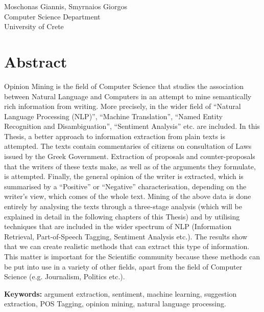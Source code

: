 Moschonas Giannis, Smyrnaios Giorgos\\
Computer Science Department\\
University of Crete \setlength{\parskip}{0.5cm}

\thispagestyle{plain}			%
\setlength{\parskip}{0pt plus 1.0pt}
\section*{Abstract}
Opinion Mining is the field of Computer Science that studies the association between Natural Language and Computers in an attempt to mine semantically rich information from writing. More precisely, in the wider field of ``Natural Language Processing (NLP)'', ``Machine Translation'', ``Named Entity Recognition and Disambiguation'', ``Sentiment Analysis'' etc. are included. In this Thesis, a better approach to information extraction from plain texts is attempted. The texts contain commentaries of citizens on consultation of Laws issued by the Greek Government. Extraction of proposals and counter-proposals that the writers of these texts make, as well as of the arguments they formulate, is attempted. Finally, the general opinion of the writer is extracted, which is summarised by a ``Positive'' or ``Negative'' characterisation, depending on  the writer's view, which comes of the whole text. Mining of the above data is done entirely by analysing the texts through a three-stage analysis (which will be explained in detail in the following chapters of this Thesis) and by utilising techniques that are included in the wider spectrum of NLP (Information Retrieval, Part-of-Speech Tagging, Sentiment Analysis etc.). The results show that we can create realistic methods that can extract this type of information. This matter is important for the Scientific community because these methods can be put into use in a variety of other fields, apart from the field of Computer Science (e.g. Journalism, Politics etc.).





\vfill
\textbf{Keywords:} argument extraction, sentiment, machine learning, suggestion extraction, POS Tagging, opinion mining, natural language processing.
